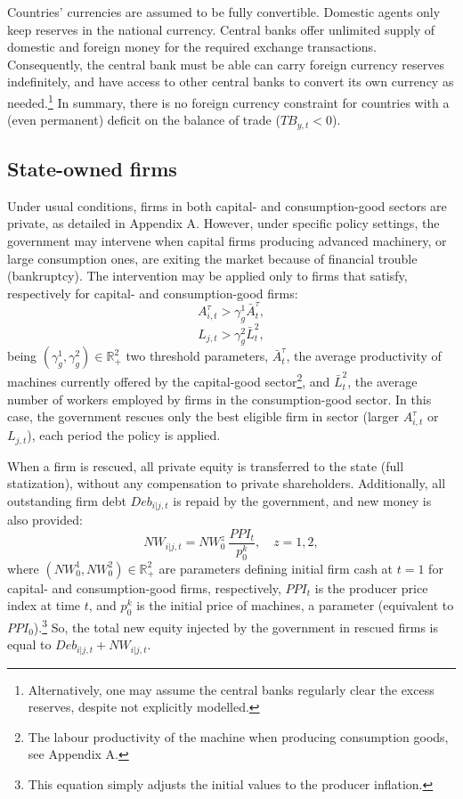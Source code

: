 \documentclass[a4paper,11pt]{article}
\begin{document}
Countries' currencies are assumed to be fully convertible. Domestic agents only keep reserves in the national currency. Central banks offer unlimited supply of domestic and foreign money for the required exchange transactions. Consequently, the central bank must be able can carry foreign currency reserves indefinitely, and have access to other central banks to convert its own currency as needed.\footnote{Alternatively, one may assume the central banks regularly clear the excess reserves, despite not explicitly modelled.} In summary, there is no foreign currency constraint for countries with a (even permanent) deficit on the balance of trade (${TB}_{y,t} < 0$).


\subsection{State-owned firms}

Under usual conditions, firms in both capital- and consumption-good sectors are private, as detailed in Appendix A. However, under specific policy settings, the government may intervene when capital firms producing advanced machinery, or large consumption ones, are exiting the market because of financial trouble (bankruptcy). The intervention may be applied only to firms that satisfy, respectively for capital- and consumption-good firms:
\begin{equation}
	A_{i,t}^\tau > \gamma^1_g \bar{A}_t^\tau,
\end{equation}
\begin{equation}
	L_{j,t} > \gamma^2_g \bar{L}_t^2,
\end{equation}
being $(\gamma^1_g, \gamma^2_g) \in \mathbb{R}^2_+$ two threshold parameters, $\bar{A}_t^\tau$, the average productivity of machines currently offered by the capital-good sector\footnote{The labour productivity of the machine when producing consumption goods, see Appendix A.}, and $\bar{L}_t^2$, the average number of workers employed by firms in the consumption-good sector. In this case, the government rescues only the best eligible firm in sector (larger $A_{i,t}^\tau$ or $L_{j,t}$), each period the policy is applied.

When a firm is rescued, all private equity is transferred to the state (full statization), without any compensation to private shareholders. Additionally, all outstanding firm debt $Deb_{i|j,t}$ is repaid by the government, and new money is also provided:
\begin{equation}
	NW_{i|j,t} = NW^z_0 \ \dfrac{ PPI_t }{ p^k_0 }, \quad z = 1, 2,
\end{equation}
where $(NW^1_0, NW^2_0) \in \mathbb{R}^2_+$ are parameters defining initial firm cash at $t = 1$ for capital- and consumption-good firms, respectively, $PPI_t$ is the producer price index at time $t$, and $p^k_0$ is the initial price of machines, a parameter (equivalent to $PPI_0$).\footnote{This equation simply adjusts the initial values to the producer inflation.} So, the total new equity injected by the government in rescued firms is equal to $Deb_{i|j,t} + NW_{i|j,t}$.
\end{document}
